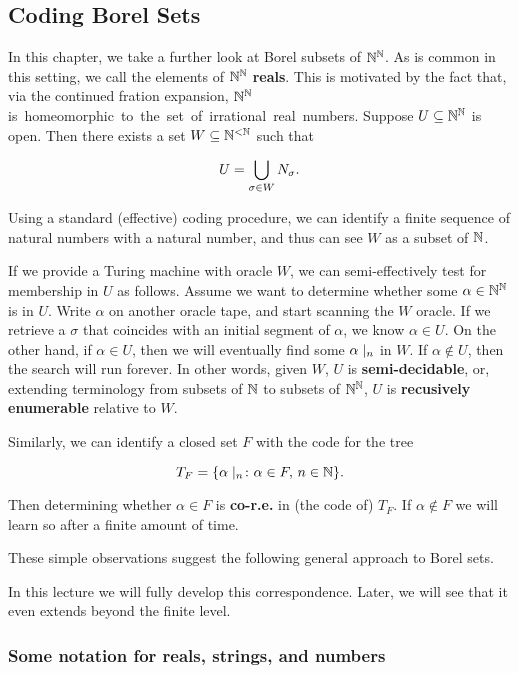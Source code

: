 \subsection{Coding Borel Sets}

In this chapter, we take a further look at Borel subsets of $\mathbb{N}^{\mathbb{N}}$. As is common in this setting, we call the elements of $\mathbb{N}^{\mathbb{N}}$ \textbf{reals}. This is motivated by the fact that, via the continued fration expansion, $\mathbb{N}^{\mathbb{N}}$ is~homeomorphic~to~the~set~of~irrational~real~numbers. Suppose $U \subseteq \mathbb{N}^{\mathbb{N}}$ is open. Then there exists a set $W \subseteq \mathbb{N}^{<\mathbb{N}}$ such that

\begin{equation}
U = \bigcup_{\sigma \in W} N_{\sigma}.
\end{equation}

Using a standard (effective) coding procedure, we can identify a finite sequence of natural numbers with a natural number, and thus can see $W$ as a subset of $\mathbb{N}$.

If we provide a Turing machine with oracle $W$, we can semi-effectively test for membership in $U$ as follows. Assume we want to determine whether some $\alpha \in \mathbb{N}^{\mathbb{N}}$ is in $U$. Write $\alpha$ on another oracle tape, and start scanning the $W$ oracle. If we retrieve a $\sigma$ that coincides with an initial segment of $\alpha$, we know $\alpha \in U$. On the other hand, if $\alpha \in U$, then we will eventually find some $\alpha\mid_{n}$ in $W$. If $\alpha \not\in U$, then the search will run forever. In other words, given $W$, $U$ is \textbf{semi-decidable}, or, extending terminology from subsets of $\mathbb{N}$ to subsets of $\mathbb{N}^{\mathbb{N}}$, $U$ is
\textbf{recusively enumerable} relative to $W$.

Similarly, we can identify a closed set $F$ with the code for the tree

\begin{equation}
T_F = \{\alpha\mid_{n} \colon \alpha\in F,\, n\in \mathbb{N} \}.
\end{equation}

Then determining whether $\alpha \in F$ is \textbf{co-r.e.} in (the code of) $T_F$. If $\alpha \not\in F$ we will learn so after a finite amount of time.

These simple observations suggest the following general approach to Borel sets.

In this lecture we will fully develop this correspondence. Later, we will see that it even extends beyond the finite level.

\subsubsection{Some notation for reals, strings, and numbers}

